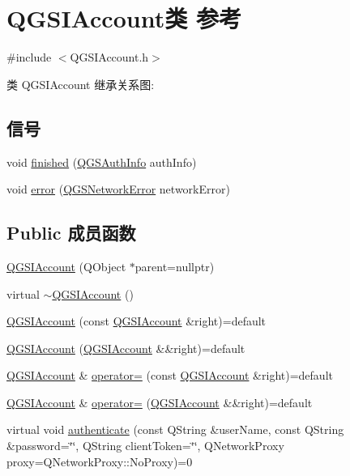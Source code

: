 \hypertarget{class_q_g_s_i_account}{}\section{Q\+G\+S\+I\+Account类 参考}
\label{class_q_g_s_i_account}


{\ttfamily \#include $<$Q\+G\+S\+I\+Account.\+h$>$}



类 Q\+G\+S\+I\+Account 继承关系图\+:
\subsection*{信号}
\begin{DoxyCompactItemize}
\item 
void \mbox{\hyperlink{class_q_g_s_i_account_a86ec48e8370f87abf2343681aa47f10a}{finished}} (\mbox{\hyperlink{class_q_g_s_auth_info}{Q\+G\+S\+Auth\+Info}} auth\+Info)
\item 
void \mbox{\hyperlink{class_q_g_s_i_account_ab249a6d5e5f4c05b8c898ac78662cce6}{error}} (\mbox{\hyperlink{class_q_g_s_network_error}{Q\+G\+S\+Network\+Error}} network\+Error)
\end{DoxyCompactItemize}
\subsection*{Public 成员函数}
\begin{DoxyCompactItemize}
\item 
\mbox{\hyperlink{class_q_g_s_i_account_a8cdaa2cf03acc3e53fe07333464b00b3}{Q\+G\+S\+I\+Account}} (Q\+Object $\ast$parent=nullptr)
\item 
virtual \mbox{\hyperlink{class_q_g_s_i_account_a992b86027191c09303dfdee5069e7e08}{$\sim$\+Q\+G\+S\+I\+Account}} ()
\item 
\mbox{\hyperlink{class_q_g_s_i_account_a2f0c0bc39152be4bd9bba9c087e0e14c}{Q\+G\+S\+I\+Account}} (const \mbox{\hyperlink{class_q_g_s_i_account}{Q\+G\+S\+I\+Account}} \&right)=default
\item 
\mbox{\hyperlink{class_q_g_s_i_account_ae041bd606d553b3287db33c6a82f6188}{Q\+G\+S\+I\+Account}} (\mbox{\hyperlink{class_q_g_s_i_account}{Q\+G\+S\+I\+Account}} \&\&right)=default
\item 
\mbox{\hyperlink{class_q_g_s_i_account}{Q\+G\+S\+I\+Account}} \& \mbox{\hyperlink{class_q_g_s_i_account_ade773adc79026086da24cf4a8b2bb328}{operator=}} (const \mbox{\hyperlink{class_q_g_s_i_account}{Q\+G\+S\+I\+Account}} \&right)=default
\item 
\mbox{\hyperlink{class_q_g_s_i_account}{Q\+G\+S\+I\+Account}} \& \mbox{\hyperlink{class_q_g_s_i_account_a2e5c4ec77b5d33e7d7823f331b51e4bd}{operator=}} (\mbox{\hyperlink{class_q_g_s_i_account}{Q\+G\+S\+I\+Account}} \&\&right)=default
\item 
virtual void \mbox{\hyperlink{class_q_g_s_i_account_ad10a95dcbe8f6071d63ecfdf60f40609}{authenticate}} (const Q\+String \&user\+Name, const Q\+String \&password=\char`\"{}\char`\"{}, Q\+String client\+Token=\char`\"{}\char`\"{}, Q\+Network\+Proxy proxy=Q\+Network\+Proxy\+::\+No\+Proxy)=0
\end{DoxyCompactItemize}



